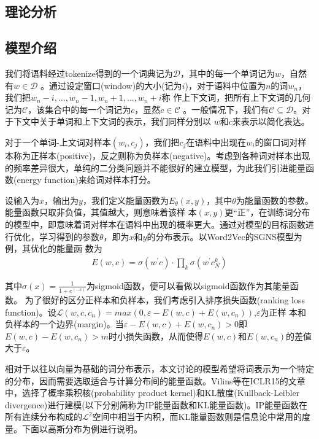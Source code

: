 \documentclass[a4paper,13pt]{article}
\begin{document}
\begin{spacing}{1.5}
\section{理论分析}

\subsection{模型介绍}

我们将语料经过tokenize得到的一个词典记为$\mathcal{D}$，其中的每一个单词记为$w$，自然有$w\in\mathcal{D}$
。通过设定窗口(window)的大小(记为$i$)，对于语料中位置为$n$的词$w_n$，我们把$w_n-i,...,w_n-1,w_n+1,...,w_n+i$称
作上下文词，把所有上下文词的几何记为$\mathcal{C}$，该集合中的每一个词记为$c$，显然$c\in\mathcal{C}$
。一般情况下，我们有$\mathcal{C}\subseteq\mathcal{D}$。对于下文中关于单词和上下文词的表示，我们同样分别以
$w$和$c$来表示以简化表达。

对于一个单词-上文词对样本$(w_i,c_j)$，我们把$c_j$在语料中出现在$w_i$的窗口词对样本称为正样本(positive)，反之则称为负样本(negative)。考虑到各种词对样本出现的频率差异很大，单纯的二分类问题并不能很好的建立模型，为此我们引进能量函数(energy function)来给词对样本打分。

设输入为$x$，输出为$y$，我们定义能量函数为$E_\theta(x,y)$，其中$\theta$为能量函数的参数。能量函数只取非负值，其值越大，则意味着该样
本$(x,y)$更“正”，在训练词分布的模型中，即意味着词对样本在语料中出现的概率更大。通过对模型的目标函数进行优化，学习得到的参数$\theta$，即为$x$和$y$的分布表示。以Word2Vec的SGNS模型为例，其优化的能量函
数为
\begin{align*}
E(w,c)=\sigma(w^{\prime{}}c)\cdot\prod_k\sigma(w^{\prime{}}c_N^k)
\end{align*}

其中$\sigma(x)=\frac{1}{1+e^(-x)}$为sigmoid函数，便可以看做以sigmoid函数作为其能量函数。
为了很好的区分正样本和负样本，我们考虑引入排序损失函数(ranking loss function)。设$\mathcal{L}(w,c,c_n)=max(0,\varepsilon-E(w,c)+E(w,c_n))$,$\varepsilon$为正样
本和负样本的一个边界(margin)。当$\varepsilon-E(w,c)+E(w,c_n)>0$即$E(w,c)-E(w,c_n)>m$时小损失函数，从而使得$E(w,c)$和$E(w,c_n)$的差值大于$\varepsilon$。

相对于以往以向量为基础的词分布表示，本文讨论的模型希望将词表示为一个特定的分布，因而需要选取适合与计算分布间的能量函数。Vilins等在ICLR15的文章中，选择了概率乘积核(probability product kernel)和KL散度(Kullback-Leibler divergence)进行建模(以下分别简称为IP能量函数和KL能量函数)。IP能量函数在所有连续分布构成的$\mathcal{L}^2$空间中相当于内积，而KL能量函数则是信息论中常用的度量。下面以高斯分布为例进行说明。


\end{spacing}
\end{document}
